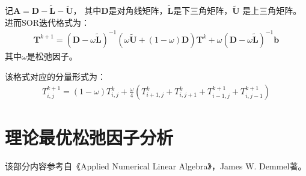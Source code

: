 \documentclass[12pt, a4paper]{article}
\begin{document}
记$\mathbf{A} = \mathbf{D} - \widetilde{\mathbf{L}} - \widetilde{\mathbf{U}}$，
其中$\mathbf{D}$是对角线矩阵，$\widetilde{\mathbf{L}}$是下三角矩阵，$\widetilde{\mathbf{U}}$
是上三角矩阵。进而SOR迭代格式为：
\begin{align}
    \mathbf{T}^{k+1} = (\mathbf{D}-\omega\widetilde{\mathbf{L}})^{-1}(\omega\widetilde{\mathbf{U}}+(1-\omega)\textbf{D})\mathbf{T}^{k} + \omega(\mathbf{D}-\omega\widetilde{\mathbf{L}})^{-1}\mathbf{b}
\end{align}
其中$\omega$是松弛因子。

该格式对应的分量形式为：
\begin{align}
    T^{k+1}_{i,j}=(1-\omega)T^k_{i,j} + \frac{\omega}{4}(T^k_{i+1,j}+T^k_{i,j+1}+T^{k+1}_{i-1,j}+T^{k+1}_{i,j-1})
\end{align}

\section{理论最优松弛因子分析}
该部分内容参考自《Applied Numerical Linear Algebra》，James W. Demmel著。
\end{document}
